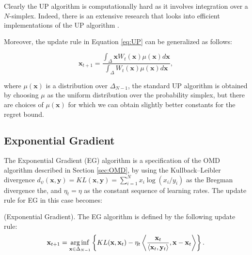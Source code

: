 Clearly the UP algorithm is computationally hard as it involves integration over a $N$-simplex. Indeed, there is an extensive research that looks into efficient implementations of the UP algorithm \cite{kalai2002efficient}.


Moreover, the update rule in Equation \eqref{eq:UP} can be generalized as follows:

\begin{equation}\label{eq:general_UP}
\mathbf x_{t+1}=\frac{\int_{\Delta}\mathbf x W_t(\mathbf x)\mu(\mathbf x)d\mathbf x}{\int_{\Delta} W_t(\mathbf x)\mu(\mathbf x)d\mathbf x},
\end{equation}

where $\mu(\mathbf x)$ is a distribution over $\Delta_{N-1}$, the standard UP algorithm is obtained by choosing $\mu$ as the uniform distribution over the probability simplex, but there are choices of $\mu(\mathbf x)$ for which we can obtain slightly better constants for the regret bound.




\subsection{Exponential Gradient}\label{sec:EG}

The Exponential Gradient (EG) algorithm is a specification of the OMD algorithm described in Section \ref{sec:OMD}, by using the Kullback–Leibler divergence $d_\psi(\mathbf x,\mathbf y)=KL(\mathbf x,\mathbf y)=\sum\limits_{i=1}^Nx_i\log(x_i/y_i)$ as the Bregman divergence the, and $\eta_t=\eta$ as the constant sequence of learning rates. The update rule for EG in this case becomes:

\begin{definition}(Exponential Gradient). The EG algorithm is defined by the following update rule:
\begin{equation}\label{eq:update_EG}
\mathbf x_{t+1}=\operatorname*{arg\,inf}\limits_{\mathbf x\in\Delta_{N-1}} \left\{KL(\mathbf x,\mathbf x_t)-\eta_t\left\langle \frac{\mathbf x_t}{\langle \mathbf x_t,\mathbf y_t\rangle},\mathbf x-\mathbf x_t\right\rangle\right\}.
\end{equation}
\end{definition}

